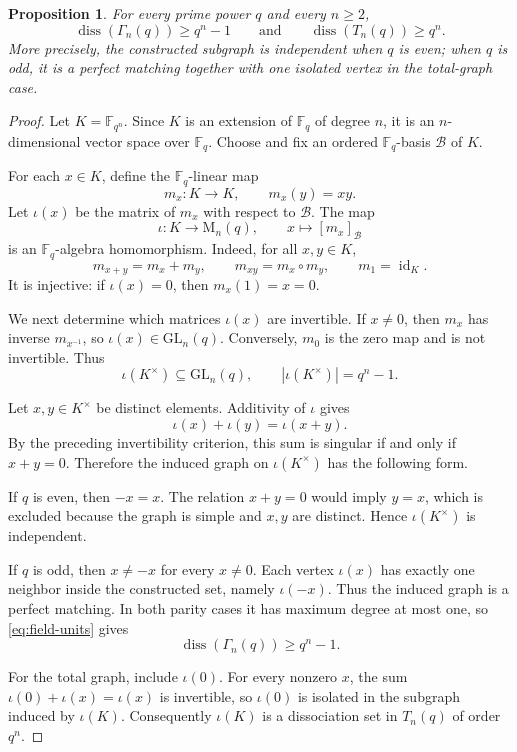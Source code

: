 \documentclass[11pt]{article}
\newtheorem{proposition}[theorem]{Proposition}
\theoremstyle{definition}
\DeclareMathOperator{\diss}{diss}
\newcommand{\F}{\mathbb{F}}
\newcommand{\Mat}{\mathrm{M}}
\newcommand{\GL}{\mathrm{GL}}
\begin{document}
\begin{proposition}\label{prop:lower}
For every prime power $q$ and every $n\ge2$,
\[
  \diss(\Gamma_n(q))\ge q^n-1
  \qquad\text{and}\qquad
  \diss(T_n(q))\ge q^n.
\]
More precisely, the constructed subgraph is independent when $q$ is even;
when $q$ is odd, it is a perfect matching together with one isolated vertex
in the total-graph case.
\end{proposition}

\begin{proof}
Let $K=\F_{q^n}$.  Since $K$ is an extension of $\F_q$ of degree $n$, it is
an $n$-dimensional vector space over $\F_q$.  Choose and fix an ordered
$\F_q$-basis $\mathcal B$ of $K$.

For each $x\in K$, define the $\F_q$-linear map
\[
  m_x:K\longrightarrow K,
  \qquad
  m_x(y)=xy.
\]
Let $\iota(x)$ be the matrix of $m_x$ with respect to $\mathcal B$.  The map
\[
  \iota:K\longrightarrow\Mat_n(q),
  \qquad x\longmapsto[m_x]_{\mathcal B}
\]
is an $\F_q$-algebra homomorphism.  Indeed, for all $x,y\in K$,
\[
  m_{x+y}=m_x+m_y,
  \qquad
  m_{xy}=m_x\circ m_y,
  \qquad
  m_1=\operatorname{id}_K.
\]
It is injective: if $\iota(x)=0$, then $m_x(1)=x=0$.

We next determine which matrices $\iota(x)$ are invertible.  If $x\ne0$,
then $m_x$ has inverse $m_{x^{-1}}$, so $\iota(x)\in\GL_n(q)$.  Conversely,
$m_0$ is the zero map and is not invertible.  Thus
\begin{equation}\label{eq:field-units}
  \iota(K^\times)\subseteq\GL_n(q),
  \qquad
  |\iota(K^\times)|=q^n-1.
\end{equation}

Let $x,y\in K^\times$ be distinct elements.  Additivity of $\iota$ gives
\[
  \iota(x)+\iota(y)=\iota(x+y).
\]
By the preceding invertibility criterion, this sum is singular if and only if $x+y=0$.  Therefore the induced graph on $\iota(K^\times)$ has the following form.

If $q$ is even, then $-x=x$.  The relation $x+y=0$ would imply $y=x$, which is excluded because the graph is simple and $x,y$ are distinct.  Hence $\iota(K^\times)$ is independent.

If $q$ is odd, then $x\ne-x$ for every $x\ne0$.  Each vertex $\iota(x)$ has exactly one neighbor inside the constructed set, namely $\iota(-x)$.  Thus the induced graph is a perfect matching.  In both parity cases it has maximum degree at most one, so \eqref{eq:field-units} gives
\[
  \diss(\Gamma_n(q))\ge q^n-1.
\]

For the total graph, include $\iota(0)$.  For every nonzero $x$, the sum
$\iota(0)+\iota(x)=\iota(x)$ is invertible, so $\iota(0)$ is isolated in the
subgraph induced by $\iota(K)$.  Consequently $\iota(K)$ is a dissociation
set in $T_n(q)$ of order $q^n$.
\end{proof}
\end{document}
